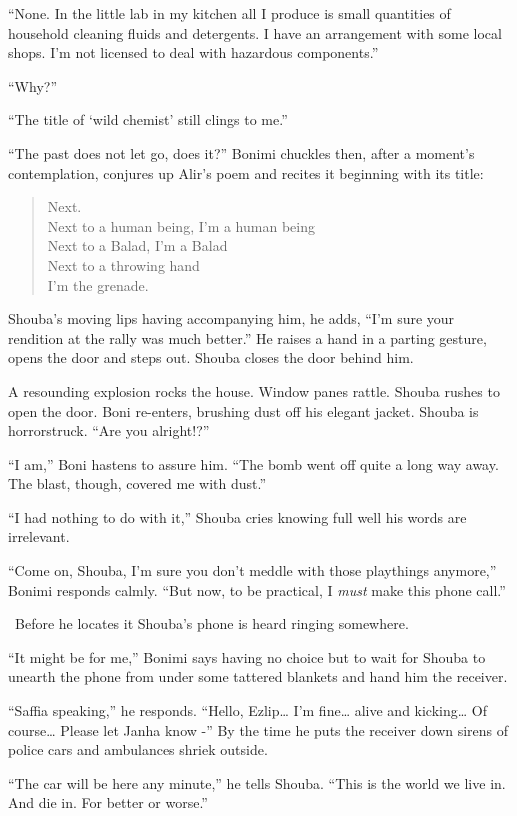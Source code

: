 \documentclass[twoside,11pt]{book}
\begin{document}
``None. In the little lab in my kitchen all I produce is small quantities of household cleaning fluids and
detergents. I have an arrangement with some local shops. I'm not licensed to deal with hazardous
components.''

``Why?''

``The title of `wild chemist' still clings to me.''

``The past does not let go, does it?'' Bonimi chuckles then, after a moment's contemplation,
conjures up Alir's poem and recites it beginning with its title:
\begin{verse}
Next. \\
Next to a human being, I'm a human being \\
Next to a Balad, I'm a Balad \\
Next to a throwing hand \\
I'm the grenade.
\end{verse}
Shouba's moving lips having accompanying him, he adds, ``I'm sure your rendition
at the rally was much better.'' He raises a hand in a parting gesture, opens the door and steps out.
Shouba closes the door behind him.

A resounding explosion rocks the house. Window panes rattle. Shouba rushes to open the door. Boni re-enters, brushing
dust off his elegant jacket. Shouba is horrorstruck. ``Are you alright!?''

``I am,'' Boni hastens to assure him. ``The bomb went off quite a long way away. The blast, though, covered
me with dust.''

``I had nothing to do with it,'' Shouba cries knowing full well his words are irrelevant.

``Come on, Shouba, I'm sure you don't meddle with those playthings anymore,'' Bonimi responds
calmly. ``But now, to be practical, I \textit{must} make this phone call.''

\ Before he locates it Shouba's phone is heard ringing somewhere.

``It might be for me,'' Bonimi says having no choice but to wait for Shouba to unearth the
phone from under some tattered blankets and hand him the receiver.

``Saffia speaking,'' he responds. ``Hello, Ezlip{\dots} I'm fine{\ldots} alive and
kicking{\ldots} Of course{\dots} Please let Janha know -'' By the time he puts the receiver down sirens of
police cars and ambulances shriek outside.

``The car will be here any minute,'' he tells Shouba. ``This is the world we live
in. And die in. For better or worse.''
\end{document}
